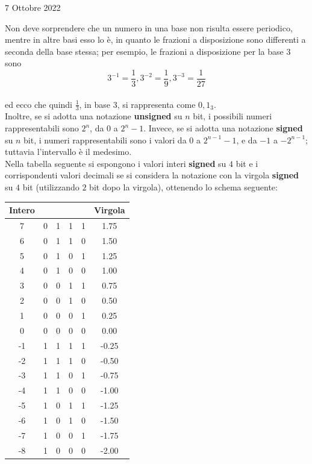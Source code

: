 \documentclass[a4paper]{extarticle}
\renewcommand\arraystretch{}
\begin{document}
\newpage
\begin{center}
    7 Ottobre 2022
\end{center}
Non deve sorprendere che un numero in una base non risulta essere periodico, mentre in altre basi esso lo è, in quanto le frazioni a disposizione sono differenti a seconda della base stessa; per esempio, le frazioni a disposizione per la base $3$ sono
\[3^{-1}=\frac{1}{3}, 3^{-2}=\frac{1}{9}, 3^{-3}=\frac{1}{27}\]\\
ed ecco che quindi $\frac{1}{3}$, in base $3$, si rappresenta come $0,1_3$.\\
Inoltre, se si adotta una notazione \textbf{unsigned} su $n$ bit, i possibili numeri rappresentabili sono $2^n$, da $0$ a $2^{n}-1$. Invece, se si adotta una notazione \textbf{signed} su $n$ bit, i numeri rappresentabili sono i valori da $0$ a $2^{n-1}-1$, e da $-1$ a $-2^{n-1}$; tuttavia l'intervallo è il medesimo.\\
Nella tabella seguente si espongono i valori interi \textbf{signed} su $4$ bit e i corrispondenti valori decimali se si considera la notazione con la virgola \textbf{signed} su $4$ bit (utilizzando $2$ bit dopo la virgola), ottenendo lo schema seguente:

\vspace{1em}
\setlength{\tabcolsep}{4pt}
\renewcommand{\arraystretch}{1}
\begin{table}[H]
    \centering
    \begin{tabular}{c|cccc|c}
        Intero & & & & & Virgola\\
        \hline
        7 & 0 & 1 & 1 & 1 & 1.75\\
        6 & 0 & 1 & 1 & 0 & 1.50\\
        5 & 0 & 1 & 0 & 1 & 1.25\\
        4 & 0 & 1 & 0 & 0 & 1.00\\
        3 & 0 & 0 & 1 & 1 & 0.75\\
        2 & 0 & 0 & 1 & 0 & 0.50\\
        1 & 0 & 0 & 0 & 1 & 0.25\\
        0 & 0 & 0 & 0 & 0 & 0.00\\
        \hline
        -1 & 1 & 1 & 1 & 1 & -0.25\\
        -2 & 1 & 1 & 1 & 0 & -0.50\\
        -3 & 1 & 1 & 0 & 1 & -0.75\\
        -4 & 1 & 1 & 0 & 0 & -1.00\\
        -5 & 1 & 0 & 1 & 1 & -1.25\\
        -6 & 1 & 0 & 1 & 0 & -1.50\\
        -7 & 1 & 0 & 0 & 1 & -1.75\\
        -8 & 1 & 0 & 0 & 0 & -2.00\\
        \hline
    \end{tabular}
\end{table}
\end{document}
